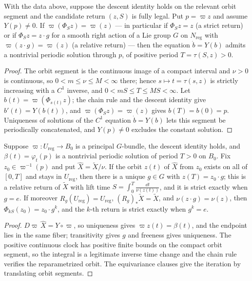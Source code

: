 \begin{proposition}
\label{prop:p0-reduction-descent}
With the data above, suppose the descent identity holds on the relevant orbit
segment and the candidate return $(z,S)$ is fully legal.  Put $p=\varpi z$ and assume
$Y(p)\neq0$.  If $\varpi(\Phi_S z)=\varpi(z)$ --- in particular if $\Phi_S z=z$ (a strict
return) or if $\Phi_S z=z\cdot g$ for a smooth right action of a Lie group $G$ on
$N_{\mathrm{reg}}$ with $\varpi(z\cdot g)=\varpi(z)$ (a relative return) --- then the
equation $\dot b=Y(b)$ admits a nontrivial periodic solution through $p$, of
positive period $T=\tau(S,z)>0$.
\end{proposition}

\begin{proof}
The orbit segment is the continuous image of a compact interval and $\nu>0$ is
continuous, so $0<m\le\nu\le M<\infty$ there; hence $s\mapsto t=\tau(s,z)$ is
strictly increasing with a $C^1$ inverse, and $0<mS\le T\le MS<\infty$.  Let
$b(t)=\varpi(\Phi_{s(t)}z)$; the chain rule and the descent identity give
$b'(t)=Y(b(t))$, and $\varpi(\Phi_S z)=\varpi(z)$ gives $b(T)=b(0)=p$.  Uniqueness of
solutions of the $C^1$ equation $\dot b=Y(b)$ lets this segment be periodically
concatenated, and $Y(p)\neq0$ excludes the constant solution.
\end{proof}

\begin{proposition}
\label{prop:p0-reduction-reverse}
Suppose $\varpi\colon U_{\mathrm{reg}}\to B_0$ is a principal $G$-bundle, the descent
identity holds, and $\beta(t)=\varphi_t(p)$ is a nontrivial periodic solution of
period $T>0$ on $B_0$.  Fix $z_0\in\varpi^{-1}(p)$ and put
$\widehat X=\widetilde X/\nu$.  If the orbit $z(t)$ of $\widehat X$ from $z_0$
exists on all of $[0,T]$ and stays in $U_{\mathrm{reg}}$, then there is a unique
$g\in G$ with $z(T)=z_0\cdot g$; this is a relative return of $\widetilde X$ with
lift time $S=\int_0^T\frac{\dd t}{\nu(z(t))}$, and it is strict exactly when $g=e$.
If moreover $R_g(U_{\mathrm{reg}})=U_{\mathrm{reg}}$,
$(R_g)_*\widetilde X=\widetilde X$, and $\nu(z\cdot g)=\nu(z)$, then
$\Phi_{kS}(z_0)=z_0\cdot g^k$, and the $k$-th return is strict exactly when
$g^k=e$.
\end{proposition}

\begin{proof}
$D\varpi\,\widehat X=Y\circ\varpi$, so uniqueness gives $\varpi z(t)=\beta(t)$, and the
endpoint lies in the same fiber; transitivity gives $g$ and freeness gives
uniqueness.  The positive continuous clock has positive finite bounds on the
compact orbit segment, so the integral is a legitimate inverse time change and the
chain rule verifies the reparametrized orbit.  The equivariance clauses give the
iteration by translating orbit segments.
\end{proof}

